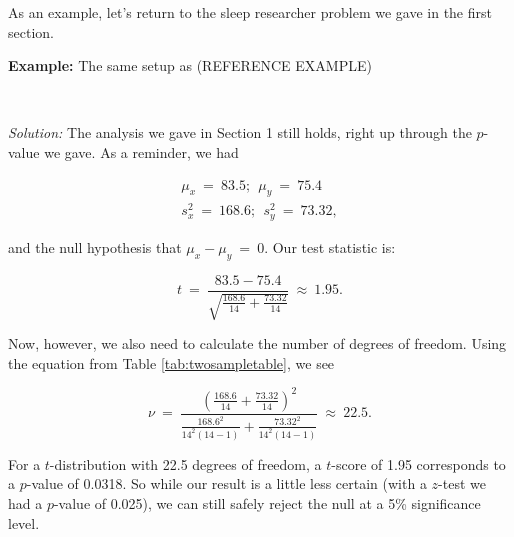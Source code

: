 As an example, let's return to the sleep researcher problem we gave in the first section.



\textbf{Example:}  The same setup as (REFERENCE EXAMPLE)



~



\emph{Solution:}  The analysis we gave in Section 1 still holds, right up through the $p$-value we gave. As a reminder, we had



\begin{eqnarray}

\mu_x\ = \ 83.5;\ \ \mu_y\ = \ 75.4 \nonumber\\ s^2_x\ = \ 168.6;\ \ s^2_y\ = \ 73.32,

\end{eqnarray}

and the null hypothesis that $\mu_x - \mu_y\ = \ 0$.  Our test statistic is:



\begin{equation*}

t\ = \ \frac{83.5-75.4}{\sqrt{\frac{168.6}{14}+\frac{73.32}{14}}}\ \approx \ 1.95.

\end{equation*}

Now, however, we also need to calculate the number of degrees of freedom.  Using the equation from Table \ref{tab:twosampletable}, we see



\begin{equation*}

\nu\ = \ \frac{\left(\frac{168.6}{14} + \frac{73.32}{14}\right)^2}{\frac{168.6^2}{14^2\left(14 - 1\right)} + \frac{73.32^2}{14^2\left(14 - 1\right)}}\ \approx \ 22.5.

\end{equation*}

For a $t$-distribution with 22.5 degrees of freedom, a $t$-score of 1.95 corresponds to a $p$-value of 0.0318.  So while our result is a little less certain (with a $z$-test we had a $p$-value of 0.025), we can still safely reject the null at a 5\% significance level.







